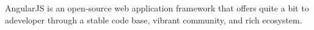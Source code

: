 AngularJS is an open-source web application framework that offers quite a bit to adeveloper  through  a  stable  code  base,  vibrant  community,  and  rich  ecosystem.

%

%

